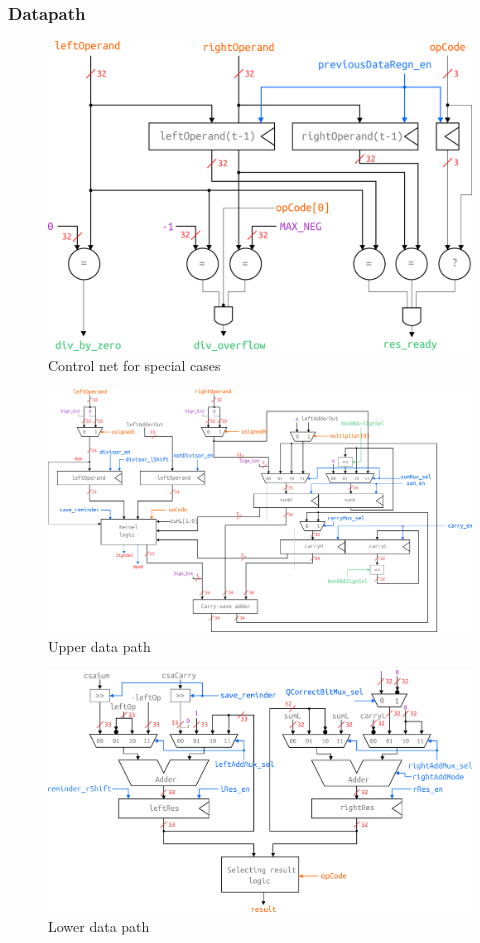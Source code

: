 \subsubsection{Datapath}
\begin{figure}[H]
\centering
\includegraphics[scale=1]{pics/feedbackNet.png}
    \caption{Control net for special cases}
    \label{fig:my_label}
\end{figure}
\begin{figure}[H]
\centering
\includegraphics[angle=90,scale=1]{pics/kernelLogic.png}
    \caption{Upper data path}
    \label{fig:my_label}
\end{figure}
\begin{figure}[H]
\centering
\includegraphics[scale=0.9]{pics/outputAdders.png}
    \caption{Lower data path}
    \label{fig:my_label}
\end{figure}
